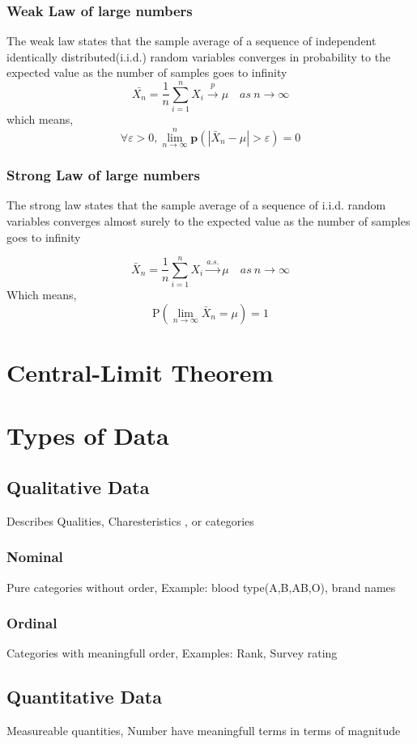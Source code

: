 \documentclass[12pt]{extarticle}
\begin{document}
\subsubsection{Weak Law of large numbers}
The weak law states that the sample average of a sequence of independent identically distributed(i.i.d.) random variables converges in probability to the expected value as the number of samples goes to infinity
$$\bar{X_n} = \frac{1}{n}\sum_{i=1}^{n}X_i \xrightarrow{p} \mu \quad as \ n \to \infty $$
which means, 
$$\forall \varepsilon>0, \lim_{n \to \infty}^n \mathbf{p}(|\bar{X}_n-\mu| > \varepsilon) = 0 $$
\subsubsection{Strong Law of large numbers}
The strong law states that the sample average of a sequence of i.i.d. random variables converges almost surely to the expected value as the number of samples goes to infinity 

$$\bar{X}_n = \frac{1}{n} \sum_{i=1}^n X_i \xrightarrow{a.s.} \mu \quad as\ n \to \infty$$
Which means, 
$$ \mathrm{P}(\lim_{n \to \infty} \bar{X}_n = \mu ) = 1 $$

\section{Central-Limit Theorem}

\section{Types of Data}
\subsection{Qualitative Data}
Describes Qualities, Charesteristics , or categories
\subsubsection{Nominal}
Pure categories without order, 
Example: blood type(A,B,AB,O), brand names
\subsubsection{Ordinal}
Categories with meaningfull order,
Examples: Rank, Survey rating
\subsection{Quantitative Data}
Measureable quantities, Number have meaningfull terms in terms of magnitude
\end{document}
